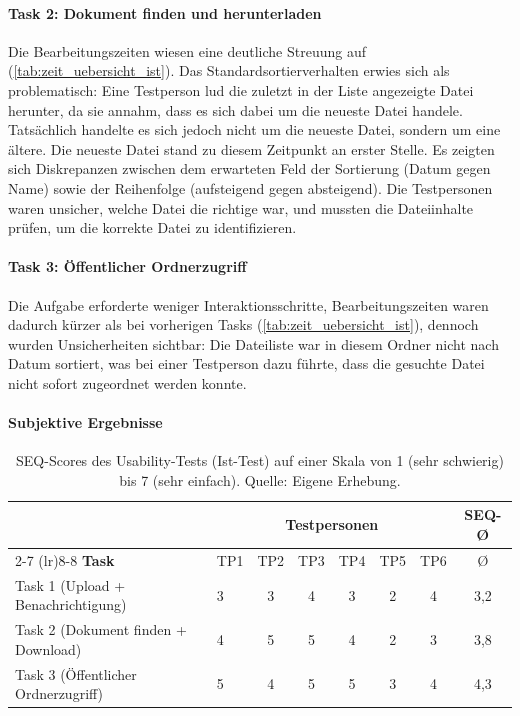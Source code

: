 \paragraph{Task 2: Dokument finden und herunterladen}

Die Bearbeitungszeiten wiesen eine deutliche Streuung auf (\autoref{tab:zeit_uebersicht_ist}). Das Standardsortierverhalten erwies sich als problematisch: Eine Testperson lud die zuletzt in der Liste angezeigte Datei herunter, da sie annahm, dass es sich dabei um die neueste Datei handele. Tatsächlich handelte es sich jedoch nicht um die neueste Datei, sondern um eine ältere. Die neueste Datei stand zu diesem Zeitpunkt an erster Stelle. Es zeigten sich Diskrepanzen zwischen dem erwarteten Feld der Sortierung (Datum gegen Name) sowie der Reihenfolge (aufsteigend gegen absteigend). Die Testpersonen waren unsicher, welche Datei die richtige war, und mussten die Dateiinhalte prüfen, um die korrekte Datei zu identifizieren.

\paragraph{Task 3: Öffentlicher Ordnerzugriff}

Die Aufgabe erforderte weniger Interaktionsschritte, Bearbeitungszeiten waren dadurch kürzer als bei vorherigen Tasks (\autoref{tab:zeit_uebersicht_ist}), dennoch wurden Unsicherheiten sichtbar: Die Dateiliste war in diesem Ordner nicht nach Datum sortiert, was bei einer Testperson dazu führte, dass die gesuchte Datei nicht sofort zugeordnet werden konnte.

\vfill

\paragraph{Subjektive Ergebnisse}\null\hfill

\begin{table}[H]
    \centering
    \scriptsize
    \begin{tabular}{p{6.0cm} p{0.45cm} c c c c c | c}
        \toprule
        \multicolumn{1}{c}{} & \multicolumn{6}{c|}{\textbf{Testpersonen}} & \multicolumn{1}{c}{\textbf{SEQ-Ø}} \\
        \cmidrule(lr){2-7} \cmidrule(lr){8-8}
        \textbf{Task} & TP1 & TP2 & TP3 & TP4 & TP5 & TP6 & Ø \\
        \midrule
        Task 1 (Upload + Benachrichtigung) & 3 & 3 & 4 & 3 & 2 & 4 & 3{,}2 \\
        Task 2 (Dokument finden + Download) & 4 & 5 & 5 & 4 & 2 & 3 & 3{,}8 \\
        Task 3 (Öffentlicher Ordnerzugriff) & 5 & 4 & 5 & 5 & 3 & 4 & 4{,}3 \\
        \bottomrule
    \end{tabular}
    \caption[SEQ-Scores Ist-Test]{SEQ-Scores des Usability-Tests (Ist-Test) auf einer Skala von 1 (sehr schwierig) bis 7 (sehr einfach). Quelle: Eigene Erhebung.}
    \label{tab:seq_ist}
\end{table}

